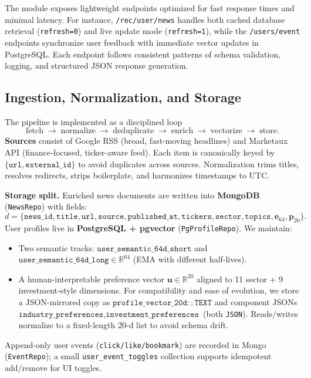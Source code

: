 The module exposes lightweight endpoints optimized for fast response times and minimal latency. For instance, \texttt{/rec/user/news} handles both cached database retrieval (\texttt{refresh=0}) and live update mode (\texttt{refresh=1}), while the \texttt{/users/event} endpoints synchronize user feedback with immediate vector updates in PostgreSQL. Each endpoint follows consistent patterns of schema validation, logging, and structured JSON response generation.

\subsection{Ingestion, Normalization, and Storage}

The pipeline is implemented as a disciplined loop
\[
\text{fetch}\;\rightarrow\;\text{normalize}\;\rightarrow\;\text{deduplicate}\;\rightarrow\;\text{enrich}\;\rightarrow\;\text{vectorize}\;\rightarrow\;\text{store}.
\]
\textbf{Sources} consist of Google RSS (broad, fast-moving headlines) and Marketaux API (finance-focused, ticker-aware feed). Each item is canonically keyed by \(\{\texttt{url}, \texttt{external\_id}\}\) to avoid duplicates across sources. Normalization trims titles, resolves redirects, strips boilerplate, and harmonizes timestamps to UTC.

\textbf{Storage split.} Enriched news documents are written into \textbf{MongoDB} (\texttt{NewsRepo}) with fields:
\[
d=\{\texttt{news\_id},\texttt{title},\texttt{url},\texttt{source},\texttt{published\_at},\texttt{tickers},\texttt{sector},\texttt{topics},\mathbf{e}_{64},\mathbf{p}_{20}\}.
\]
User profiles live in \textbf{PostgreSQL + pgvector} (\texttt{PgProfileRepo}). We maintain:
\begin{itemize}
  \item Two semantic tracks: \(\texttt{user\_semantic\_64d\_short}\) and \(\texttt{user\_semantic\_64d\_long}\in\mathbb{R}^{64}\) (EMA with different half-lives).
  \item A human-interpretable preference vector \(\mathbf{u}\in\mathbb{R}^{20}\) aligned to 11 sector + 9 investment-style dimensions. For compatibility and ease of evolution, we store a JSON-mirrored copy as \(\texttt{profile\_vector\_20d}::\texttt{TEXT}\) and component JSONs \(\texttt{industry\_preferences}, \texttt{investment\_preferences}\) (both \texttt{JSON}). Reads/writes normalize to a fixed-length 20-d list to avoid schema drift.
\end{itemize}
Append-only user events (\texttt{click/like/bookmark}) are recorded in Mongo (\texttt{EventRepo}); a small \texttt{user\_event\_toggles} collection supports idempotent add/remove for UI toggles.

